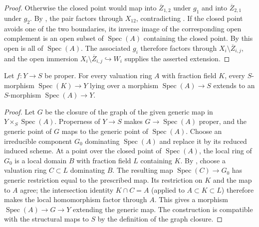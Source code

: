 \begin{proof}
  \leanok
  Otherwise the closed point would map into $\overline Z_{1,2}$ under $g_1$
  and into $\overline Z_{2,1}$ under $g_2$.  By
  , the pair factors
  through $X_{12}$, contradicting
  .  If the closed point avoids
  one of the two boundaries, its inverse image of the corresponding open
  complement is an open subset of $\operatorname{Spec}(A)$ containing the
  closed point.  By
   this open is all of
  $\operatorname{Spec}(A)$.  The associated $g_i$ therefore factors
  through $X_i\setminus\overline Z_{i,j}$, and the open immersion
  $X_i\setminus\overline Z_{i,j}\hookrightarrow W_i$ supplies the asserted
  extension.
\end{proof}

\begin{lemma}
  \label{lemma:nagata-proper-valuative-criterion-existence-api}
  \leanok

  Let $f\colon Y\to S$ be proper.  For every valuation ring $A$ with
  fraction field $K$, every $S$-morphism
  $\operatorname{Spec}(K)\to Y$ lying over a morphism
  $\operatorname{Spec}(A)\to S$ extends to an $S$-morphism
  $\operatorname{Spec}(A)\to Y$.
\end{lemma}

\begin{proof}
  \leanok
  Let $G$ be the closure of the graph of the given generic map in
  $Y\times_S\operatorname{Spec}(A)$.  Properness of $Y\to S$ makes
  $G\to\operatorname{Spec}(A)$ proper, and the generic point of $G$ maps to
  the generic point of $\operatorname{Spec}(A)$.  Choose an irreducible
  component $G_0$ dominating $\operatorname{Spec}(A)$ and replace it by its
  reduced induced scheme.  At a point over the closed point of
  $\operatorname{Spec}(A)$, the local ring of $G_0$ is a local domain $B$
  with fraction field $L$ containing $K$.  By
  , choose a valuation
  ring $C\subset L$ dominating $B$.  The resulting map
  $\operatorname{Spec}(C)\to G_0$ has generic restriction equal to the
  prescribed map.  Its restriction on $K$ and the map to $A$ agree; the
  intersection identity
  $K\cap C=A$ (applied to $A\subset K\subset L$) therefore makes the local
  homomorphism factor through $A$.  This gives a morphism
  $\operatorname{Spec}(A)\to G\to Y$ extending the generic map.  The
  construction is compatible with the structural maps to $S$ by the
  definition of the graph closure.
\end{proof}


